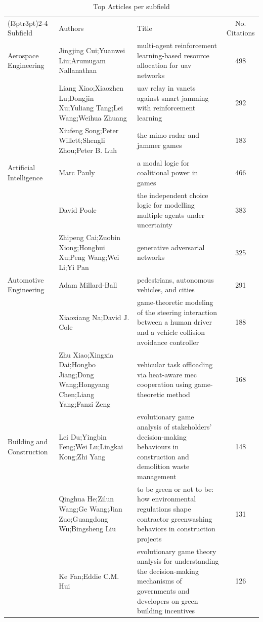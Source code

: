 \documentclass[
  12pt,
]{article}
\begin{document}
\begin{longtable}[t]{|>{\raggedright\arraybackslash}p{4cm}>{\raggedright\arraybackslash}p{4cm}>{\raggedright\arraybackslash}p{4cm}>{}c|}
\caption{\label{tab:top_articles_per_subfield}Top Articles per subfield}\\
\toprule
\multicolumn{1}{c}{ } & \multicolumn{3}{c}{Top Articles per Subfield (Descending Order)} \\
\cmidrule(l{3pt}r{3pt}){2-4}
Subfield & Authors & Title & No. Citations\\
\midrule
Aerospace Engineering & Jingjing Cui;Yuanwei Liu;Arumugam Nallanathan & multi-agent reinforcement learning-based resource allocation for uav networks & 498\\
 & Liang Xiao;Xiaozhen Lu;Dongjin Xu;Yuliang Tang;Lei Wang;Weihua Zhuang & uav relay in vanets against smart jamming with reinforcement learning & 292\\
 & Xiufeng Song;Peter Willett;Shengli Zhou;Peter B. Luh & the mimo radar and jammer games & 183\\
Artificial Intelligence & Marc Pauly & a modal logic for coalitional power in games & 466\\
 & David Poole & the independent choice logic for modelling multiple agents under uncertainty & 383\\
 & Zhipeng Cai;Zuobin Xiong;Honghui Xu;Peng Wang;Wei Li;Yi Pan & generative adversarial networks & 325\\
Automotive Engineering & Adam Millard‐Ball & pedestrians, autonomous vehicles, and cities & 291\\
 & Xiaoxiang Na;David J. Cole & game-theoretic modeling of the steering interaction between a human driver and a vehicle collision avoidance controller & 188\\
 & Zhu Xiao;Xingxia Dai;Hongbo Jiang;Dong Wang;Hongyang Chen;Liang Yang;Fanzi Zeng & vehicular task offloading via heat-aware mec cooperation using game-theoretic method & 168\\
Building and Construction & Lei Du;Yingbin Feng;Wei Lu;Lingkai Kong;Zhi Yang & evolutionary game analysis of stakeholders' decision-making behaviours in construction and demolition waste management & 148\\
 & Qinghua He;Zilun Wang;Ge Wang;Jian Zuo;Guangdong Wu;Bingsheng Liu & to be green or not to be: how environmental regulations shape contractor greenwashing behaviors in construction projects & 131\\
 & Ke Fan;Eddie C.M. Hui & evolutionary game theory analysis for understanding the decision-making mechanisms of governments and developers on green building incentives & 126\\

\end{longtable}
\end{document}
